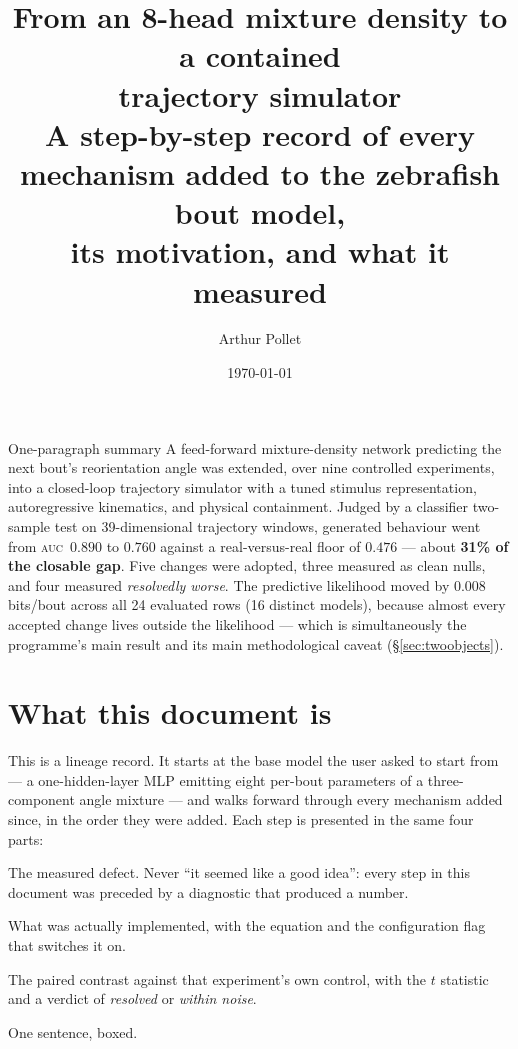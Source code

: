 \documentclass[11pt,a4paper]{article}
\title{\vspace{-1.2cm}\textbf{From an 8-head mixture density to a contained\\
       trajectory simulator}\\[4pt]
       \large A step-by-step record of every mechanism added to the
       zebrafish bout model,\\ its motivation, and what it measured}
\author{Arthur Pollet}
\date{\today}
\newcommand{\auc}{\textsc{auc}}
\begin{document}
\maketitle
\vspace{-0.8cm}

\begin{keybox}{One-paragraph summary}
A feed-forward mixture-density network predicting the next bout's reorientation angle
was extended, over nine controlled experiments, into a closed-loop trajectory simulator
with a tuned stimulus representation, autoregressive kinematics, and physical
containment. Judged by a classifier two-sample test on 39-dimensional trajectory
windows, generated behaviour went from \auc\ $0.890$ to $\mathbf{0.760}$ against a
real-versus-real floor of $\mathbf{0.476}$ --- about \textbf{31\% of the closable gap}.
Five changes were adopted, three measured as clean nulls, and four measured
\emph{resolvedly worse}. The predictive likelihood moved by $0.008$ bits/bout across all
24 evaluated rows (16 distinct models), because almost every accepted change lives outside
the likelihood ---
which is simultaneously the programme's main result and its main methodological caveat
(\S\ref{sec:twoobjects}).
\end{keybox}

\tableofcontents
\newpage

\section{What this document is}

This is a lineage record. It starts at the base model the user asked to start from ---
a one-hidden-layer MLP emitting eight per-bout parameters of a three-component angle
mixture --- and walks forward through every mechanism added since, in the order they were
added. Each step is presented in the same four parts:

\begin{description}\itemsep2pt
\item[Motivation.] The measured defect. Never ``it seemed like a good idea'': every step
      in this document was preceded by a diagnostic that produced a number.
\item[Mechanism.] What was actually implemented, with the equation and the configuration
      flag that switches it on.
\item[Result.] The paired contrast against that experiment's own control, with the
      $t$ statistic and a verdict of \emph{resolved} or \emph{within noise}.
\item[Take-away.] One sentence, boxed.
\end{description}
\end{document}
